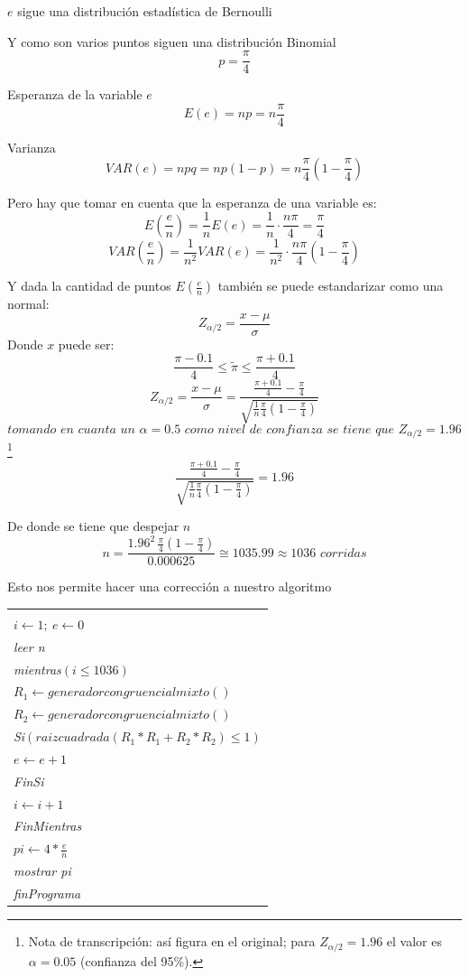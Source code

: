 \documentclass[11pt,letterpaper]{report}
\newenvironment{algoritmo}
  {\begin{center}\begin{tabular}{|p{0.85\textwidth}|}\hline\vspace{-0.2cm}\begin{tabbing}\hspace{0.6cm}\=\hspace{0.6cm}\=\hspace{0.6cm}\=\hspace{0.6cm}\=\hspace{0.6cm}\=\kill}
  {\end{tabbing}\vspace{-0.4cm}\\\hline\end{tabular}\end{center}}
\begin{document}
$e$ sigue una distribución estadística de Bernoulli

Y como son varios puntos siguen una distribución Binomial
\[
p = \frac{\pi}{4}
\]

Esperanza de la variable $e$
\[
E(e) = np = n\frac{\pi}{4}
\]

Varianza
\[
VAR(e) = npq = np(1-p) = n\frac{\pi}{4}\left(1 - \frac{\pi}{4}\right)
\]

Pero hay que tomar en cuenta que la esperanza de una variable es:
\[
E\left(\frac{e}{n}\right) = \frac{1}{n}E(e) = \frac{1}{n} \cdot \frac{n\pi}{4} = \frac{\pi}{4}
\]
\[
VAR\left(\frac{e}{n}\right) = \frac{1}{n^2}VAR(e) = \frac{1}{n^2} \cdot \frac{n\pi}{4}\left(1 - \frac{\pi}{4}\right)
\]

Y dada la cantidad de puntos $E\left(\frac{e}{n}\right)$ también se puede estandarizar como una normal:
\[
Z_{\alpha/2} = \frac{x - \mu}{\sigma}
\]
Donde $x$ puede ser:
\[
\frac{\pi - 0.1}{4} \leq \tilde{\pi} \leq \boxed{\frac{\pi + 0.1}{4}}
\]
\[
Z_{\alpha/2} = \frac{x - \mu}{\sigma} = \frac{\frac{\pi + 0.1}{4} - \frac{\pi}{4}}{\sqrt{\frac{1}{n}\frac{\pi}{4}\left(1 - \frac{\pi}{4}\right)}}
\]
\[
\textit{tomando en cuanta un } \alpha = 0.5 \textit{ como nivel de confianza se tiene que } Z_{\alpha/2} = 1.96
\]
\footnote{Nota de transcripción: así figura en el original; para $Z_{\alpha/2} = 1.96$ el valor es $\alpha = 0.05$ (confianza del 95\%).}
\[
\frac{\frac{\pi + 0.1}{4} - \frac{\pi}{4}}{\sqrt{\frac{1}{n}\frac{\pi}{4}\left(1 - \frac{\pi}{4}\right)}} = 1.96
\]

De donde se tiene que despejar $n$
\[
n = \frac{1.96^2\,\frac{\pi}{4}\left(1 - \frac{\pi}{4}\right)}{0.000625} \cong 1035.99 \approx 1036 \textit{ corridas}
\]

Esto nos permite hacer una corrección a nuestro algoritmo

\begin{algoritmo}
\textit{ProgramaCalculoPI}\\
\>$i \leftarrow 1;\ e \leftarrow 0$\\
\>\textit{leer n}\\
\>\textit{mientras}$(i \leq 1036)$\\
\>\>$R_1 \leftarrow generadorcongruencialmixto()$\\
\>\>$R_2 \leftarrow generadorcongruencialmixto()$\\
\>\>\textit{Si}$(raizcuadrada(R_1 * R_1 + R_2 * R_2) \leq 1)$\\
\>\>\>$e \leftarrow e + 1$\\
\>\>\textit{FinSi}\\
\>\>$i \leftarrow i + 1$\\
\>\textit{FinMientras}\\
\>$pi \leftarrow 4 * \frac{e}{n}$\\
\>\textit{mostrar pi}\\
\textit{finPrograma}
\end{algoritmo}
\end{document}

